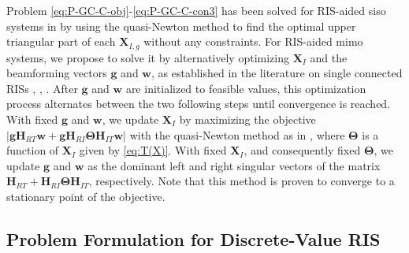 \documentclass[twocolumn,10pt]{IEEEtran}
\begin{document}
Problem \eqref{eq:P-GC-C-obj}-\eqref{eq:P-GC-C-con3} has been solved for RIS-aided \gls{siso} systems in \cite{she20} by using the quasi-Newton method to find the optimal upper triangular part of each $\mathbf{X}_{I,g}$ without any constraints.
For RIS-aided \gls{mimo} systems, we propose to solve it by alternatively optimizing $\mathbf{X}_I$ and the beamforming vectors $\mathbf{g}$ and $\mathbf{w}$, as established in the literature on single connected RISs \cite{wu21}, \cite{wu19c}, \cite{zap21}.
After $\mathbf{g}$ and $\mathbf{w}$ are initialized to feasible values, this optimization process alternates between the two following steps until convergence is reached.
With fixed $\mathbf{g}$ and $\mathbf{w}$, we update $\mathbf{X}_I$ by maximizing the objective $\left|\mathbf{g}\mathbf{H}_{RT}\mathbf{w}+\mathbf{g}\mathbf{H}_{RI}\boldsymbol{\Theta}\mathbf{H}_{IT}\mathbf{w}\right|$ with the quasi-Newton method as in \cite{she20}, where $\boldsymbol{\Theta}$ is a function of $\mathbf{X}_I$ given by \eqref{eq:T(X)}.
With fixed $\mathbf{X}_I$, and consequently fixed $\boldsymbol{\Theta}$, we update $\mathbf{g}$ and $\mathbf{w}$ as the dominant left and right singular vectors of the matrix $\mathbf{H}_{RT}+\mathbf{H}_{RI}\boldsymbol{\Theta}\mathbf{H}_{IT}$, respectively.
Note that this method is proven to converge to a stationary point of the objective.

\subsection{Problem Formulation for Discrete-Value RIS}
\end{document}
